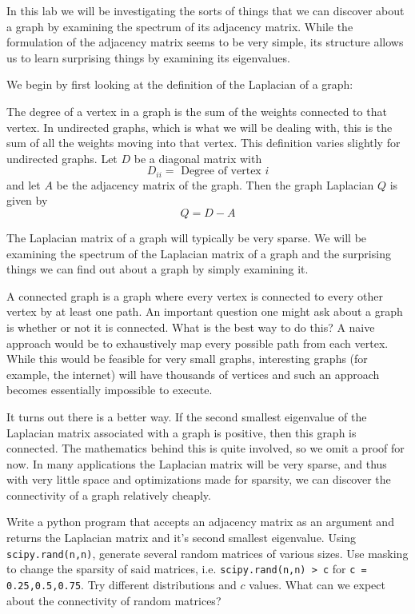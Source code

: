 \documentclass{newsiambook}
\begin{document}
In this lab we will be investigating the sorts of things that we can discover about a graph by examining the spectrum of its  adjacency matrix.  While the formulation of the adjacency matrix seems to be very simple, its structure allows us to learn surprising things by examining its eigenvalues.  

We begin by first looking at the definition of the Laplacian of a graph:

\begin{definition}  The degree of a vertex in a graph is the sum of the weights connected to that vertex.  In undirected graphs, which is what we will be dealing with, this is the sum of all the weights moving into that vertex.  This definition varies slightly for undirected graphs. Let $D$ be a diagonal matrix with
\[
D_{ii} = \mbox{ Degree of vertex $i$}
\]
and let $A$ be the adjacency matrix of the graph.  Then the graph Laplacian $Q$ is given by
\[
Q = D-A
\]
\end{definition}

The Laplacian matrix of a graph will typically be very sparse.  We will be examining the spectrum of the Laplacian matrix of a graph and the surprising things we can find out about a graph by simply examining it.    

A connected graph is a graph where every vertex is connected to every other vertex by at least one path.  An important question one might ask about a graph is whether or not it is connected.  What is the best way to do this?  A naive approach would be to exhaustively map every possible path from each vertex.  While this would be feasible for very small graphs, interesting graphs (for example, the internet) will have thousands of vertices and such an approach becomes essentially impossible to execute.

It turns out there is a better way.  If the second smallest eigenvalue of the Laplacian matrix associated with a graph is positive, then this graph is connected.  The mathematics behind this is quite involved, so we omit a proof for now.  In many applications the Laplacian matrix will be very sparse, and thus with very little space and optimizations made for sparsity, we can discover the connectivity of a graph relatively cheaply.

\begin{problem}Write a python program that accepts an adjacency matrix as an argument and returns the Laplacian matrix and it's second smallest eigenvalue.  Using {\tt scipy.rand(n,n)}, generate several random matrices of various sizes.  Use masking to change the sparsity of said matrices, i.e. {\tt scipy.rand(n,n) > c} for {\tt c = 0.25,0.5,0.75}.  Try different distributions and $c$ values.  What can we expect about the connectivity of random matrices?
\end{problem}
\end{document}
